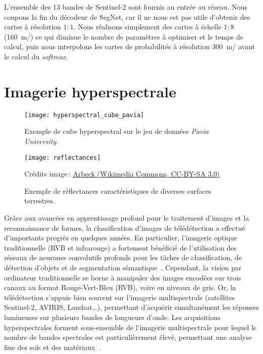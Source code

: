 L'ensemble des 13 bandes de Sentinel-2 sont fournis au entrée au réseau. Nous coupons la fin du décodeur de SegNet, car il ne nous est pas utile d'obtenir des cartes à résolution $1:1$. Nous réalisons simplement des cartes à échelle $1:8$ (\SI{160}{\meter/\px}) ce qui diminue le nombre de paramètres à optimiser et le temps de calcul, puis nous interpolons les cartes de probabilités à résolution \SI{300}{\meter/\px} avant le calcul du \emph{softmax}.




\section{Imagerie hyperspectrale}

\begin{figure}
  \begin{minipage}[t]{0.485\textwidth}
      \texttt{[image: hyperspectral\_cube\_pavia]}
      \caption{Exemple de cube hyperspectral sur le jeu de données \emph{Pavia University}.}
      \label{fig:cube_hyperspectral}
  \end{minipage}
  \hfill
  \begin{minipage}[t]{0.485\textwidth}
      \texttt{[image: reflectances]}
      \caption{Exemple de réflectances caractéristiques de diverses surfaces terrestres.}
      \small{Crédits image\,: \href{https://commons.wikimedia.org/wiki/File:R\%C3\%A9flectance_surfaces_terrestres.png}{Arbeck (Wikimedia Commons, CC-BY-SA 3.0)}}
      \label{fig:reflectances}
  \end{minipage}
\end{figure}

Grâce aux avancées en apprentissage profond pour le traitement d'images et la reconnaissance de formes, la classification d'images de télédétection a effectué d'importants progrès en quelques années. En particulier, l'imagerie optique traditionnelle (\gls{RVB} et infrarouge) a fortement bénéficié de l'utilisation des réseaux de neurones convolutifs profonds pour les tâches de classification, de détection d'objets et de segmentation sémantique~\cite{audebert_semantic_2016,volpi_dense_2017,marmanis_semantic_2016}. Cependant, la vision par ordinateur traditionnelle se borne à manipuler des images encodées sur trois canaux au format Rouge-Vert-Bleu (RVB), voire en niveaux de gris. Or, la télédétection s'appuie bien souvent sur l'imagerie multispectrale (satellites Sentinel-2, AVIRIS, Landsat\dots), permettant d'acquérir simultanément les réponses lumineuses sur plusieurs bandes de longueurs d'onde. Les acquisitions hyperspectrales forment sous-ensemble de l'imagerie multispectrale pour lequel le nombre de bandes spectrales est particulièrement élevé, permettant une analyse fine des sols et des matériaux~\cite{cubero-castan_physics-based_2015,fabre_estimation_2015}.

